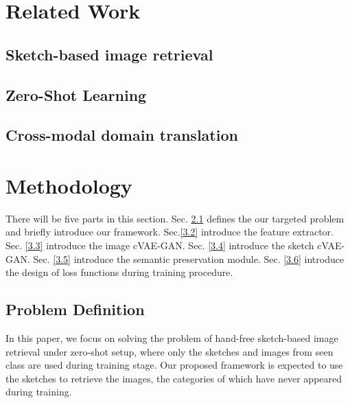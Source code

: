 \documentclass[10pt,twocolumn,letterpaper]{article}
\begin{document}

\section{Related Work}

\subsection{Sketch-based image retrieval}

\subsection{Zero-Shot Learning}

\subsection{Cross-modal domain translation}

\section{Methodology}
There will be five parts in this section. Sec. \ref{3.1} defines the our targeted problem and briefly introduce our framework. Sec.\ref{3.2} introduce the feature extractor. Sec. \ref{3.3} introduce the image cVAE-GAN. Sec. \ref{3.4} introduce the sketch cVAE-GAN. Sec. \ref{3.5} introduce the semantic preservation module. Sec. \ref{3.6} introduce the design of loss functions during training procedure.

\subsection{Problem Definition} \label{3.1}
In this paper, we focus on solving the problem of hand-free sketch-based image retrieval under zero-shot setup, where only the sketches and images from seen class are used during training stage. Our proposed framework is expected to use the sketches to retrieve the images, the categories of which have never appeared during training.
\end{document}
